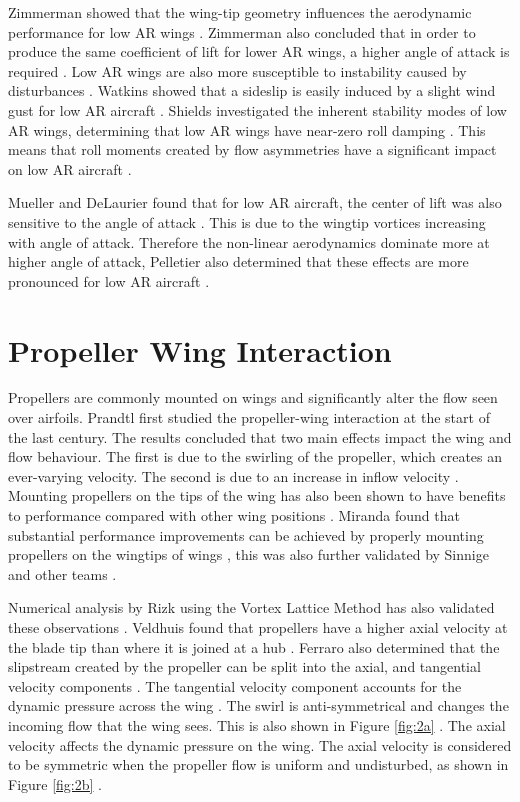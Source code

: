  Zimmerman showed that the wing-tip geometry influences the aerodynamic performance for low AR wings \cite{Zimmerman1936}. Zimmerman also concluded that in order to produce the same coefficient of lift for lower AR wings, a higher angle of attack is required \cite{Zimmerman1936}. Low AR wings are also more susceptible to instability caused by disturbances \cite{DeVoria2017}. Watkins showed that a sideslip is easily induced by a slight wind gust for low AR aircraft \cite{Watkins2012}. Shields investigated the inherent stability modes of low AR wings, determining that low AR wings have near-zero roll damping \cite{Shields2015}. This means that roll moments created by flow asymmetries have a significant impact on low AR aircraft \cite{Shields2015}.
 
 Mueller and DeLaurier found that for low AR aircraft, the center of lift was also sensitive to the angle of attack \cite{Mueller2003}. This is due to the wingtip vortices increasing with angle of attack. Therefore the non-linear aerodynamics dominate more at higher angle of attack, Pelletier also determined that these effects are more pronounced for low AR aircraft \cite{Pelletier2012}. 


\section{Propeller Wing Interaction}




Propellers are commonly mounted on wings and significantly alter the flow seen over airfoils. Prandtl first studied the propeller-wing interaction at the start of the last century. The results concluded that two main effects impact the wing and flow behaviour. The first is due to the swirling of the propeller, which creates an ever-varying velocity. The second is due to an increase in inflow velocity \cite{Pant}. Mounting propellers on the tips of the wing has also been shown to have benefits to performance compared with other wing positions \cite{Miranda1986}. Miranda found that substantial performance improvements can be achieved by properly mounting propellers on the wingtips of wings \cite{Miranda1986}, this was also further validated by Sinnige \cite{Sinnige2019} and other teams \cite{Veldhuis2000} \cite{review}. 

Numerical analysis by Rizk using the Vortex Lattice Method has also validated these observations \cite{Rizk2012}. Veldhuis found that propellers have a higher axial velocity at the blade tip than where it is joined at a hub \cite{Veldhuis2000}. Ferraro also determined that the slipstream created by the propeller can be split into the axial, and tangential velocity components \cite{Ferraro2014}. The tangential velocity component accounts for the dynamic pressure across the wing \cite{Ferraro2014}. The swirl is anti-symmetrical and changes the incoming flow that the wing sees. This is also shown in Figure \ref{fig:2a} \cite{Ferraro2014}. The axial velocity affects the dynamic pressure on the wing. The axial velocity is considered to be symmetric when the propeller flow is uniform and undisturbed, as shown in Figure \ref{fig:2b} \cite{Ferraro2014}.


